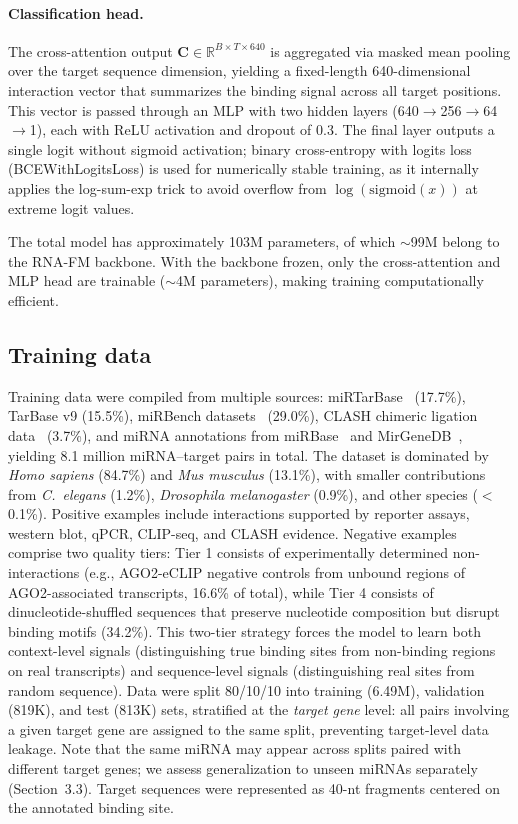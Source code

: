 \documentclass[10pt,a4paper]{article}
\begin{document}
\paragraph{Classification head.} The cross-attention output $\mathbf{C} \in \mathbb{R}^{B \times T \times 640}$ is aggregated via masked mean pooling over the target sequence dimension, yielding a fixed-length 640-dimensional interaction vector that summarizes the binding signal across all target positions. This vector is passed through an MLP with two hidden layers (640$\to$256$\to$64$\to$1), each with ReLU activation and dropout of 0.3. The final layer outputs a single logit without sigmoid activation; binary cross-entropy with logits loss (BCEWithLogitsLoss) is used for numerically stable training, as it internally applies the log-sum-exp trick to avoid overflow from $\log(\text{sigmoid}(x))$ at extreme logit values.

The total model has approximately 103M parameters, of which $\sim$99M belong to the RNA-FM backbone. With the backbone frozen, only the cross-attention and MLP head are trainable ($\sim$4M parameters), making training computationally efficient.

\subsection{Training data}

Training data were compiled from multiple sources: miRTarBase~\citep{chou2018mirtarbase} (17.7\%), TarBase v9 (15.5\%), miRBench datasets~\citep{sammut2025mirbench} (29.0\%), CLASH chimeric ligation data~\citep{helwak2013clash} (3.7\%), and miRNA annotations from miRBase~\citep{kozomara2019mirbase} and MirGeneDB~\citep{fromm2022mirgenedb}, yielding 8.1 million miRNA--target pairs in total. The dataset is dominated by \textit{Homo sapiens} (84.7\%) and \textit{Mus musculus} (13.1\%), with smaller contributions from \textit{C.\ elegans} (1.2\%), \textit{Drosophila melanogaster} (0.9\%), and other species ($<$0.1\%). Positive examples include interactions supported by reporter assays, western blot, qPCR, CLIP-seq, and CLASH evidence. Negative examples comprise two quality tiers: Tier 1 consists of experimentally determined non-interactions (e.g., AGO2-eCLIP negative controls from unbound regions of AGO2-associated transcripts, 16.6\% of total), while Tier 4 consists of dinucleotide-shuffled sequences that preserve nucleotide composition but disrupt binding motifs (34.2\%). This two-tier strategy forces the model to learn both context-level signals (distinguishing true binding sites from non-binding regions on real transcripts) and sequence-level signals (distinguishing real sites from random sequence). Data were split 80/10/10 into training (6.49M), validation (819K), and test (813K) sets, stratified at the \textit{target gene} level: all pairs involving a given target gene are assigned to the same split, preventing target-level data leakage. Note that the same miRNA may appear across splits paired with different target genes; we assess generalization to unseen miRNAs separately (Section~3.3). Target sequences were represented as 40-nt fragments centered on the annotated binding site.
\end{document}
